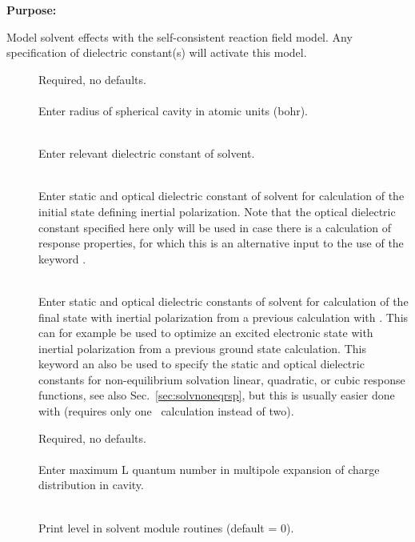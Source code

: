 {\bf Purpose:}

Model solvent effects with the self-consistent
reaction field model.
Any specification of dielectric constant(s)
will activate this model.

\begin{description}
\item[]
  Required, no defaults.\\
  \\
  Enter radius of spherical cavity in atomic units (bohr).

\item[]
  \\
  Enter relevant dielectric constant of solvent.

\item[]
  \\
  Enter static and optical dielectric constant of solvent for calculation
  of the initial state defining inertial polarization. Note that the optical dielectric constant specified here
  only will be used in case there is a calculation of response
  properties, for which this is an alternative input to the use of the
  keyword .

\item[]
  \\
  Enter static and optical dielectric constants of solvent
  for calculation of the final state with inertial polarization
  from a previous calculation with . 
  This can for example be used to optimize an excited electronic state
  with inertial polarization from a previous ground state calculation.
  This keyword an  also be used to specify the static and optical dielectric constants
  for non-equilibrium solvation linear, quadratic, or cubic response functions,
  see also Sec.~\ref{sec:solvnoneqrsp}, but this is usually easier done with
   (requires only one \dalton\ calculation instead of two).

\item[]
  Required, no defaults.\\
  \\
  Enter maximum L quantum number in multipole expansion of charge
  distribution in cavity.

\item[]
   \\
  Print level in solvent module routines (default = 0).
\end{description}

